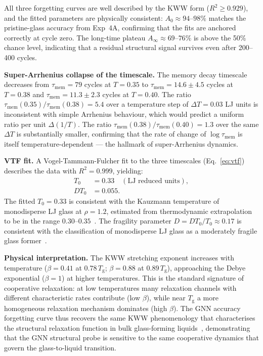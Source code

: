 \documentclass[12pt,a4paper]{article}
\newcommand{\Tg}{T_{\mathrm{g}}}
\newcommand{\vtau}{\tau_{\mathrm{mem}}}
\newcommand{\Tzero}{T_0}
\begin{document}
All three forgetting curves are well described by the KWW form ($R^2 \geq 0.929$), and the fitted parameters are physically consistent: $A_0 \approx 94$--$98\%$ matches the pristine-glass accuracy from Exp~4A, confirming that the fits are anchored correctly at cycle zero.
The long-time plateau $A_\infty \approx 69$--$76\%$ is above the 50\% chance level, indicating that a residual structural signal survives even after 200--400 cycles.
 
\textbf{Super-Arrhenius collapse of the timescale.}
The memory decay timescale decreases from $\vtau = 79$ cycles at $T = 0.35$ to $\vtau = 14.6 \pm 4.5$ cycles at $T = 0.38$ and $\vtau = 11.3 \pm 2.3$ cycles at $T = 0.40$.
The ratio $\vtau(0.35)/\vtau(0.38) = 5.4$ over a temperature step of $\Delta T = 0.03$ LJ units is inconsistent with simple Arrhenius behaviour, which would predict a uniform ratio per unit $\Delta(1/T)$.
The ratio $\vtau(0.38)/\vtau(0.40) = 1.3$ over the same $\Delta T$ is substantially smaller, confirming that the rate of change of $\log\vtau$ is itself temperature-dependent — the hallmark of super-Arrhenius dynamics.
 
\textbf{VTF fit.}
A Vogel-Tammann-Fulcher fit to the three timescales (Eq.~\ref{eq:vtf}) describes the data with $R^2 = 0.999$, yielding:
\begin{align}
  \Tzero &= 0.33 \quad (\text{LJ reduced units}), \label{eq:T0} \\
  D\Tzero &= 0.055. \label{eq:DT0}
\end{align}
The fitted $\Tzero = 0.33$ is consistent with the Kauzmann temperature of monodisperse LJ glass at $\rho = 1.2$, estimated from thermodynamic extrapolation to be in the range $0.30$--$0.35$~\cite{Debenedetti2001,Kob1995}.
The fragility parameter $D = DT_0/\Tzero \approx 0.17$ is consistent with the classification of monodisperse LJ glass as a moderately fragile glass former~\cite{Angell1985}.
 
\textbf{Physical interpretation.}
The KWW stretching exponent increases with temperature ($\beta = 0.41$ at $0.78\,\Tg$; $\beta = 0.88$ at $0.89\,\Tg$), approaching the Debye exponential ($\beta = 1$) at higher temperatures.
This is the standard signature of cooperative relaxation: at low temperatures many relaxation channels with different characteristic rates contribute (low $\beta$), while near $\Tg$ a more homogeneous relaxation mechanism dominates (high $\beta$).
The GNN accuracy forgetting curve thus recovers the same KWW phenomenology that characterises the structural relaxation function in bulk glass-forming liquids~\cite{Angell1985}, demonstrating that the GNN structural probe is sensitive to the same cooperative dynamics that govern the glass-to-liquid transition.
 
\end{document}
